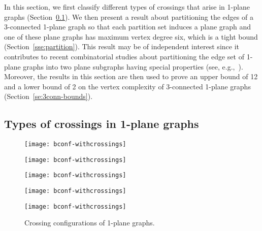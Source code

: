 \documentclass{article}
\begin{document}
In this section, we first classify  different types of crossings that arise in 1-plane graphs (Section~\ref{sse:background}).  
We then present a result about partitioning the edges of a 3-connected 1-plane graph so that each partition set induces a plane graph and one of these plane graphs has maximum vertex degree six, which is a tight bound (Section~\ref{sse:partition}). This result may be of independent interest since it contributes to recent combinatorial studies about partitioning the edge set of 1-plane graphs into two plane subgraphs having special properties (see, e.g.,~\cite{DBLP:journals/dam/Ackerman14,DBLP:journals/combinatorics/CzapH13,Lenhart201759}).
Moreover, the results in this section are then used to prove an upper bound of 12 and a lower bound of 2 on the vertex complexity of 3-connected 1-plane graphs (Section~\ref{se:3conn-bounds}). 

\subsection{Types of crossings in 1-plane graphs}\label{sse:background}

\begin{figure}[tb]
    \centering
    \begin{minipage}[b]{.18\textwidth}
    	\centering
    	\texttt{[image: bconf-withcrossings]}
    	\label{fi:bconf}
    \end{minipage}
    \begin{minipage}[b]{.18\textwidth}
    	\centering
    	\texttt{[image: bconf-withcrossings]}
    	\label{fi:kite}
    \end{minipage}
    \begin{minipage}[b]{.18\textwidth}
    	\centering
    	\texttt{[image: bconf-withcrossings]}
    	\label{fi:wconf}
    \end{minipage}
    \begin{minipage}[b]{.21\textwidth}
    	\centering
    	\texttt{[image: bconf-withcrossings]}
    	\label{fi:tconf}
    \end{minipage}
    \begin{minipage}[b]{.21\textwidth}
    	\centering
    	\texttt{[image: bconf-withcrossings]}
    	\label{fi:augtconf}
    \end{minipage}
    \caption{Crossing configurations of 1-plane graphs.\label{fi:crossings} }
\end{figure}
\end{document}
